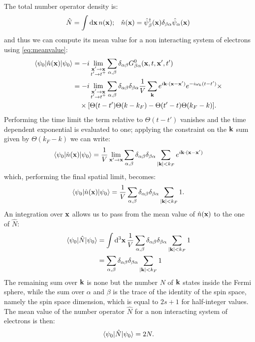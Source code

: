 \documentclass[a4paper]{article}
\begin{document}
The total number operator density is:
\begin{align}
&\hat{N} = \int \dd{\vb{x}} n(\vb{x}); &\hat{n}(\vb{x}) = \hat{\psi}^\dag_\beta(\vb{x}) \delta_{\beta\alpha}\hat{\psi}_\alpha(\vb{x})
\end{align}
and thus we can compute its mean value for a non interacting system of electrons using \eqref{eq:meanvalue}:
\begin{align}
\mel{\psi_0}{\hat{n}(\vb{x})}{\psi_0} &= - i \lim_{\substack{\vb{x}'\rightarrow \vb{x}\\t'\rightarrow t^+}} \sum_{\alpha,\beta} \delta_{\alpha\beta} G^0_{\beta\alpha}(\vb{x},t,\vb{x}',t')\\
&=- i \lim_{\substack{\vb{x}'\rightarrow \vb{x}\\t'\rightarrow t^+}} \sum_{\alpha,\beta} \delta_{\alpha\beta}\delta_{\beta\alpha} \frac{1}{V} \sum_{\vb{k}}e^{i\vb{k}\cdot(\vb{x} - \vb{x'})}e^{-i\omega_k (t-t')} \times\\
&\quad\times\bqty{\Theta(t-t')\Theta(k-k_F) - \Theta(t'-t)\Theta(k_F - k)}.
\end{align}
Performing the time limit the term relative to $\Theta(t-t')$ vanishes and the time dependent exponential is evaluated to one; applying the constraint on the $\vb{k}$ sum given by $\Theta(k_F - k)$ we can write:
\begin{equation}
\mel{\psi_0}{\hat{n}(\vb{x})}{\psi_0} = \frac{1}{V} \lim_{\vb{x}'\rightarrow \vb{x}} \sum_{\alpha,\beta} \delta_{\alpha\beta}\delta_{\beta\alpha} \sum_{\abs{\vb{k}}< k_F} e^{i\vb{k}\cdot(\vb{x} - \vb{x'})}
\end{equation}
which, performing the final spatial limit, becomes:
\begin{equation}
\mel{\psi_0}{\hat{n}(\vb{x})}{\psi_0} = \frac{1}{V} \sum_{\alpha,\beta} \delta_{\alpha\beta}\delta_{\beta\alpha} \sum_{\abs{\vb{k}}< k_F} 1.
\end{equation}
An integration over $\vb{x}$ allows us to pass from the mean value of $\hat{n}(\vb{x})$ to the one of $\hat{N}:$
\begin{align}
\mel{\psi_0}{\hat{N}}{\psi_0} &= \int \dd[3]{\vb{x}}\frac{1}{V} \sum_{\alpha,\beta} \delta_{\alpha\beta}\delta_{\beta\alpha} \sum_{\abs{\vb{k}}< k_F} 1\\
&= \sum_{\alpha,\beta} \delta_{\alpha\beta}\delta_{\beta\alpha} \sum_{\abs{\vb{k}}< k_F} 1
\end{align}
The remaining sum over $\vb{k}$ is none but the number $N$ of $\vb{k}$ states inside the Fermi sphere, while the sum over $\alpha$ and $\beta$ is the trace of the identity of the spin space, namely the spin space dimension, which is equal to $2s+1$ for half-integer values.
The mean value of the number operator $\hat{N}$ for a non interacting system of electrons is then:
\begin{equation}
\mel{\psi_0}{\hat{N}}{\psi_0} = 2N.
\end{equation}
\end{document}
